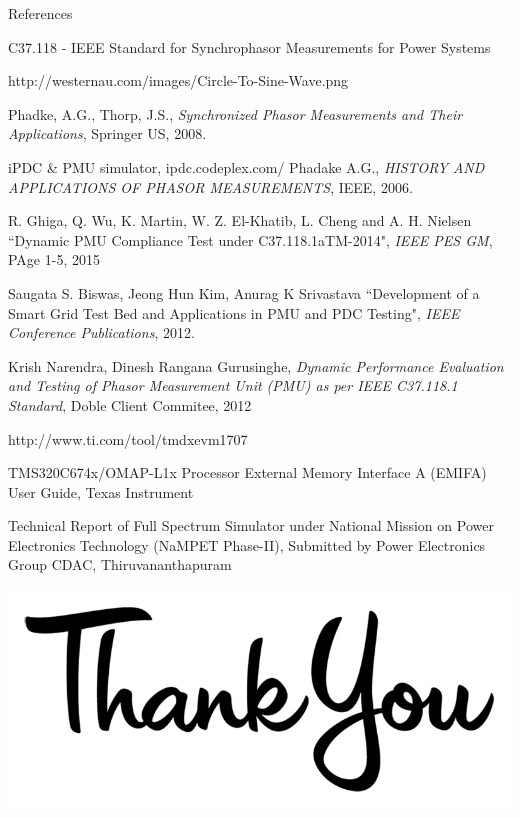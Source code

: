 \documentclass{beamer}
\begin{document}
    \begin{frame}{References}
\begin{thebibliography}{1}
	\tiny
	
	 C37.118 - IEEE Standard for Synchrophasor Measurements for Power Systems
	
	http://westernau.com/images/Circle-To-Sine-Wave.png
	
	Phadke, A.G., Thorp, J.S.,  \textit{Synchronized Phasor Measurements and Their Applications}, Springer US, 2008.
	
	iPDC \& PMU simulator, ipdc.codeplex.com/ 
	Phadake A.G., \textit{HISTORY AND APPLICATIONS OF PHASOR MEASUREMENTS}, IEEE, 2006.
	
	
	R. Ghiga, Q. Wu, K. Martin, W. Z. El-Khatib, L. Cheng and A. H. Nielsen ``Dynamic PMU Compliance Test under C37.118.1aTM-2014", \textit{IEEE PES GM}, PAge 1-5, 2015
	
	Saugata S. Biswas, Jeong Hun Kim, Anurag K Srivastava ``Development of a Smart Grid Test Bed and Applications in PMU and PDC Testing", \textit{IEEE Conference Publications}, 2012.	
	
	Krish Narendra, Dinesh Rangana Gurusinghe, \textit{Dynamic Performance Evaluation and Testing of Phasor Measurement Unit (PMU) as per IEEE C37.118.1 Standard}, Doble Client Commitee, 2012 
	
	http://www.ti.com/tool/tmdxevm1707
	
	TMS320C674x/OMAP-L1x Processor External Memory Interface A (EMIFA) User Guide, Texas Instrument

	Technical Report of Full Spectrum Simulator under National Mission on Power Electronics Technology (NaMPET Phase-II), Submitted by Power Electronics Group CDAC, Thiruvananthapuram

\end{thebibliography}
    \end{frame}


   \begin{frame}
   \begin{center}
   \includegraphics[scale=0.3]{thanku.png}
   \end{center}
   \end{frame}
\end{document}
